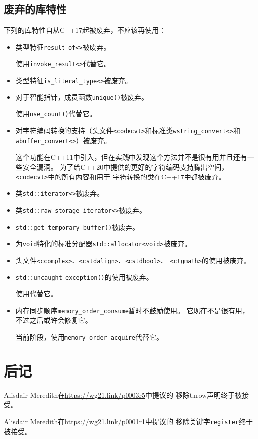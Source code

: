 \subsection{废弃的库特性}\label{ch35.2.7}
下列的库特性自从C++17起被废弃，不应该再使用：
\begin{itemize}
    \item 类型特征\texttt{result\_of<>}被废弃。

    使用\hyperref[ch21.2.0.5]{\texttt{invoke\_result<>}}代替它。
    \item 类型特征\texttt{is\_literal\_type<>}被废弃。
    \item 对于智能指针，成员函数\texttt{unique()}被废弃。

    使用\texttt{use\_count()}代替它。
    \item 对字符编码转换的支持（头文件\texttt{<codecvt>}和标准类\texttt{wstring\_convert<>}和
    \texttt{wbuffer\_convert<>}）被废弃。

    这个功能在C++11中引入，但在实践中发现这个方法并不是很有用并且还有一些安全漏洞。
    为了给C++20中提供的更好的字符编码支持腾出空间，\texttt{<codecvt>}中的所有内容和用于
    字符转换的类在C++17中都被废弃。
    \item 类\texttt{std::iterator<>}被废弃。
    \item 类\texttt{std::raw\_storage\_iterator<>}被废弃。
    \item \texttt{std::get\_temporary\_buffer()}被废弃。
    \item 为\texttt{void}特化的标准分配器\texttt{std::allocator<void>}被废弃。
    \item 头文件\texttt{<ccomplex>}、\texttt{<cstdalign>}、\texttt{<cstdbool>}、
    \texttt{<ctgmath>}的使用被废弃。
    \item \texttt{std::uncaught\_exception()}的使用被废弃。

    使用代替它。
    \item 内存同步顺序\texttt{memory\_order\_consume}暂时不鼓励使用。
    它现在不是很有用，不过之后或许会修复它。

    当前阶段，使用\texttt{memory\_order\_acquire}代替它。
\end{itemize}


\section{后记}
Alisdair Meredith在\url{https://wg21.link/p0003r5}中提议的
移除throw声明终于被接受。

Alisdair Meredith在\url{https://wg21.link/p0001r1}中提议的
移除关键字\texttt{register}终于被接受。

